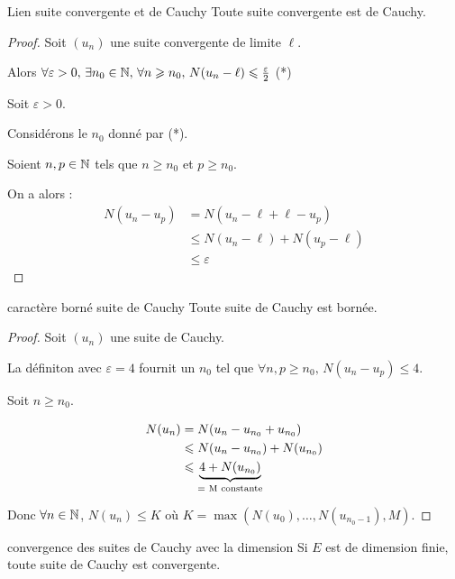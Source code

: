 \begin{proposition}{Lien suite convergente et de Cauchy}{}
    Toute suite convergente est de Cauchy.
\end{proposition}

\begin{proof}
    Soit $(u_n)$ une suite convergente de limite $\ell$.

    Alors $\forall \varepsilon > 0, \, \exists n_0 \in \mathbb{N}, \, \forall n \geqslant n_0, \, N(u_n - \ell) \leqslant \frac \varepsilon 2$ (*)

    Soit $\varepsilon > 0$. 

    Considérons le $n_0$ donné par (*). 

    Soient $n, p \in \mathbb{N}$ tels que $n \geqslant n_0$ et $p \geqslant n_0$.

    On a alors : 
    \begin{align*}
        N(u_n - u_p) & = N(u_n - \ell + \ell - u_p) \\
        & \leqslant N(u_n - \ell) + N(u_p - \ell) \\
        & \leqslant \varepsilon
    \end{align*}
\end{proof}

\begin{proposition}{caractère borné suite de Cauchy}{}
    Toute suite de Cauchy est bornée. 
\end{proposition}

\begin{proof}
    Soit $(u_n)$ une suite de Cauchy.

    La définiton avec $\varepsilon = 4$ fournit un $n_0$ tel que $\forall n, p \geqslant n_0, \, N(u_n - u_p) \leqslant 4$.

    Soit $n \geqslant n_0$. 

    \begin{align*}
        N(u_n) & = N(u_n - u_{n_0} + u_{n_0}) \\
        & \leqslant N(u_n - u_{n_0}) + N(u_{n_0}) \\
        & \leqslant  \underbrace{4 + N(u_{n_0})}_{\text{= M \text{constante}}}
    \end{align*}

    Donc $\forall n \in \mathbb{N}$, $N(u_n) \leqslant K$ où $K = \max( N(u_0), \ldots, N(u_{n_0 - 1}), M)$.
\end{proof}

\begin{theoreme}{convergence des suites de Cauchy avec la dimension}{}
    Si $E$ est de dimension finie, toute suite de Cauchy est convergente. 
\end{theoreme}

